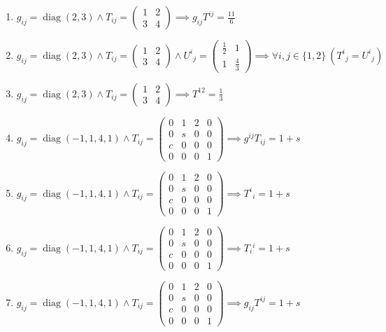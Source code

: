 \documentclass[11pt,a4paper]{article}
\begin{document}
\begin{enumerate}
\item $\displaystyle g_{ij} = \operatorname{diag}(2, 3) \land T_{ij} = \begin{pmatrix} 1 & 2 \\ 3 & 4 \end{pmatrix} \implies g_{ij} T^{ij} = \frac{11}{6}$
\item $\displaystyle g_{ij} = \operatorname{diag}(2, 3) \land T_{ij} = \begin{pmatrix} 1 & 2 \\ 3 & 4 \end{pmatrix} \land U^{i}{}_{j} = \begin{pmatrix} \frac{1}{2} & 1 \\ 1 & \frac{4}{3} \end{pmatrix} \implies \forall i, j \in \{1, 2\}\ \left( T^{i}{}_{j} = U^{i}{}_{j} \right)$
\item $\displaystyle g_{ij} = \operatorname{diag}(2, 3) \land T_{ij} = \begin{pmatrix} 1 & 2 \\ 3 & 4 \end{pmatrix} \implies T^{12} = \frac{1}{3}$
\item $\displaystyle g_{ij} = \operatorname{diag}(-1, 1, 4, 1) \land T_{ij} = \begin{pmatrix} 0 & 1 & 2 & 0 \\ 0 & s & 0 & 0 \\ c & 0 & 0 & 0 \\ 0 & 0 & 0 & 1 \end{pmatrix} \implies g^{ij} T_{ij} = 1 + s$
\item $\displaystyle g_{ij} = \operatorname{diag}(-1, 1, 4, 1) \land T_{ij} = \begin{pmatrix} 0 & 1 & 2 & 0 \\ 0 & s & 0 & 0 \\ c & 0 & 0 & 0 \\ 0 & 0 & 0 & 1 \end{pmatrix} \implies T^{i}{}_{i} = 1 + s$
\item $\displaystyle g_{ij} = \operatorname{diag}(-1, 1, 4, 1) \land T_{ij} = \begin{pmatrix} 0 & 1 & 2 & 0 \\ 0 & s & 0 & 0 \\ c & 0 & 0 & 0 \\ 0 & 0 & 0 & 1 \end{pmatrix} \implies T_{i}{}^{i} = 1 + s$
\item $\displaystyle g_{ij} = \operatorname{diag}(-1, 1, 4, 1) \land T_{ij} = \begin{pmatrix} 0 & 1 & 2 & 0 \\ 0 & s & 0 & 0 \\ c & 0 & 0 & 0 \\ 0 & 0 & 0 & 1 \end{pmatrix} \implies g_{ij} T^{ij} = 1 + s$

\end{enumerate}
\end{document}
